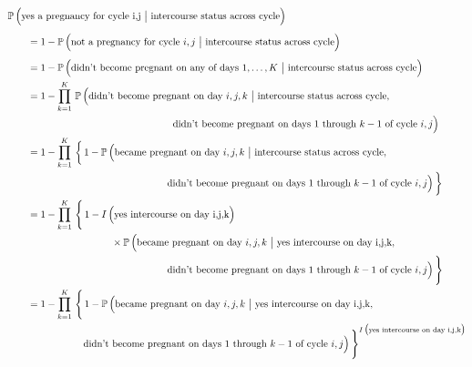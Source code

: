 \documentclass[11pt]{article}
\newcommand{\prob}{\mathbb{P}\,}
\newcommand{\ind}{I}
\begin{document}
\begin{align*} \MoveEqLeft
\prob\Big( \text{yes a pregnancy for cycle i,j} ~\big|~ \text{intercourse status across cycle} \Big) \\[1ex]
&= 1 - \prob\Big( \text{not a pregnancy for cycle } i,j ~\big|~ \text{intercourse status across cycle}  \Big) \\[1ex]
&= 1 - \prob\Big( \text{didn't become pregnant on any of days } 1,\dots,K ~\big|~ \text{intercourse status across cycle} \Big)  \\
&= 1 - \prod_{k=1}^K\, \prob\Big( \text{didn't become pregnant on day } i,j,k ~\big|~ \text{intercourse status across cycle}, \\
& \hspace{52mm} \text{didn't become pregnant on days 1 through $k-1$ of cycle } i,j \Big) \\
&= 1 - \prod_{k=1}^K\, \bigg\{\, 1 - \prob\Big( \text{became pregnant on day } i,j,k ~\big|~ \text{intercourse status across cycle}, \\
& \hspace{50mm} \text{didn't become pregnant on days 1 through $k-1$ of cycle } i,j \Big)\, \bigg\} \\
&= 1 - \prod_{k=1}^K\, \Bigg\{\, 1 - \ind\,\Big( \text{yes intercourse on day i,j,k} \Big) 
\\ & \hspace{30mm} \times \prob\Big( \text{became pregnant on day } i,j,k ~\big|~ \text{yes intercourse on day i,j,k}, \\
& \hspace{50mm} \text{didn't become pregnant on days 1 through $k-1$ of cycle } i,j \Big)\, \Bigg\} \\
&= 1 - \prod_{k=1}^K\, \Bigg\{\, 1 - \prob\Big( \text{became pregnant on day } i,j,k ~\big|~ \text{yes intercourse on day i,j,k}, \\
& \hspace{20mm} \text{didn't become pregnant on days 1 through $k-1$ of cycle } i,j \Big)\, \Bigg\}^{  \ind\,\big( \text{yes intercourse on day i,j,k} \big) } \\
\end{align*} \vspace{5mm}
\end{document}
